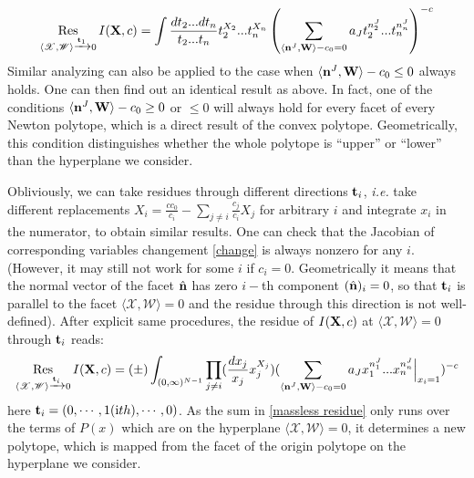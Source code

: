 \documentclass[12pt]{article}
\theoremstyle{definition}
\theoremstyle{plain}
\begin{document}
\begin{equation}
\operatorname*{Res}_{\langle {\mathscr X}, {\mathscr W}\rangle\xrightarrow{{\bf t}_1}0}I({\bf X},c)=\int \frac{dt_2...dt_n}{t_2...t_n}t_2^{X_2}...t_n^{X_n}\left(\sum_{\langle{\bf n}^J,{\bf W}\rangle-c_0=0} a_J t_2^{n^J_2}...t_n^{n^J_n}\right)^{-c}
\end{equation}
Similar analyzing can also be applied to the case when $\langle{\bf n}^J,{\bf W}\rangle-c_0\leq 0$  always holds. One can then find out an identical result as above. In fact, one of the conditions $\langle{\bf n}^J,{\bf W}\rangle-c_0\geq0$ or $\leq0$ will always hold for every facet of every Newton polytope, which is a direct result of the convex polytope.  Geometrically, this condition distinguishes whether the whole polytope is ``upper'' or ``lower'' than the hyperplane we consider. 

Obliviously, we can take residues through different directions ${\bf t}_i$, {\it i.e.} take different replacements $X_i=\frac{cc_0}{c_i}-\sum_{j\neq i}\frac{c_j}{c_i}X_j$ for arbitrary $i$ and integrate $x_i$ in the numerator, to obtain similar results.  One can check that the Jacobian of corresponding variables changement \eqref{change} is always nonzero for any $i$. (However, it may still not work for some $i$ if $c_i=0$. Geometrically it means that the normal vector of the facet $\hat{\bf n}$ has zero $i-$th component $ (\hat {\bf n})_i=0$, so that ${\bf t}_i$ is parallel to the facet $\langle {\mathscr X}, {\mathscr W}\rangle=0$ and the residue through this direction is not well-defined). After explicit same procedures, the residue of $I({\bf X},c)$ at $\langle {\mathscr X}, {\mathscr W}\rangle=0$ through ${\bf t}_i$ reads:
\begin{equation}\label{massless residue}
\operatorname*{Res}_{\langle {\mathscr X}, {\mathscr W}\rangle\xrightarrow{{\bf t}_i}0}I({\bf X},c)=(\pm)\int_{(0,\infty)^{N-1}}\prod_{j\neq i}(\frac{dx_j}{x_j}x_j^{X_j})(\sum_{\langle{\bf n}^J,{\bf W}\rangle-c_0=0} a_J x_1^{n^J_1}...x_n^{n^J_n}\Big|_{x_i=1})^{-c}
\end{equation}
here ${\bf t}_i=(0,\cdots,1({\text ith}),\cdots,0)$. As the sum in \eqref{massless residue} only runs over the terms of $P(x)$ which are on the hyperplane $\langle {\mathscr X}, {\mathscr W}\rangle=0$, it determines a new polytope, which is mapped from the facet of the origin polytope on the hyperplane we consider.
\end{document}
